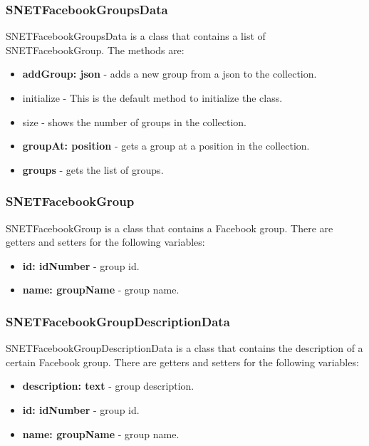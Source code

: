 \subsubsection{SNETFacebookGroupsData}
\label{sec-1-5-9}
SNETFacebookGroupsData is a class that contains a list of SNETFacebookGroup. The methods are:
\begin{itemize}
\item \textbf{addGroup: json} - adds a new group from a json to the collection.
\item initialize - This is the default method to initialize the class.
\item size - shows the number of groups in the collection.
\item \textbf{groupAt: position} - gets a group at a position in the collection.
\item \textbf{groups} - gets the list of groups.
\end{itemize}


\subsubsection{SNETFacebookGroup}
\label{sec-1-5-10}
SNETFacebookGroup is a class that contains a Facebook group. There are getters and setters for the following variables:
\begin{itemize}
\item \textbf{id: idNumber} - group id.
\item \textbf{name: groupName} - group name.
\end{itemize}


\subsubsection{SNETFacebookGroupDescriptionData}
\label{sec-1-5-11}
SNETFacebookGroupDescriptionData is a class that contains the description of a certain Facebook group. There are getters and setters for the following variables:
\begin{itemize}
\item \textbf{description: text} - group description.
\item \textbf{id: idNumber} - group id.
\item \textbf{name: groupName} - group name.
\end{itemize}


